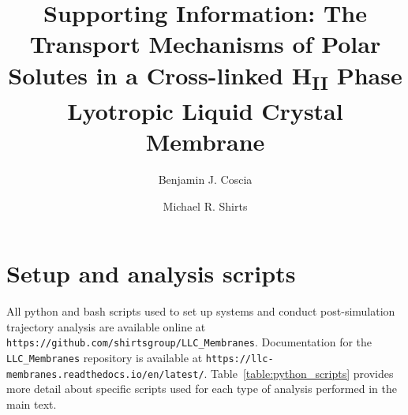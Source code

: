 \documentclass{article}
\title{Supporting Information: The Transport Mechanisms of Polar Solutes in a Cross-linked H\textsubscript{II} Phase Lyotropic Liquid Crystal Membrane}
\author{Benjamin J. Coscia \and Michael R. Shirts}
\begin{document}
  \maketitle
  \graphicspath{{./supporting_figures/}}
  

  \section{Setup and analysis scripts}\label{section:python_scripts}

  All python and bash scripts used to set up systems and conduct post-simulation trajectory
  analysis are available online at \texttt{https://github.com/shirtsgroup/LLC\_Membranes}.
  Documentation for the \texttt{LLC\_Membranes} repository is available at 
  \texttt{https://llc-membranes.readthedocs.io/en/latest/}. Table~\ref{table:python_scripts}
  provides more detail about specific scripts used for each type of analysis performed in
  the main text.
  
\end{document}
